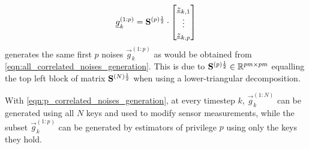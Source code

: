 \begin{equation}\label{eqn:p_correlated_noises_generation}
  {\underline{g}}_k^{(1:p)}=
  {{\mathbf{S}}}^{(p)\frac{1}{2}}\cdot
  \begin{bmatrix}
    {\underline{z}}_{k,1}\\
    \vdots\\
    {\underline{z}}_{k,p}
  \end{bmatrix}
\end{equation}
generates the same first $p$ noises $\vec{g}_k^{(1:p)}$ as would be obtained from \eqref{eqn:all_correlated_noises_generation}. This is due to ${{\mathbf{S}}}^{(p)\frac{1}{2}}\in\mathbb{R}^{pm\times pm}$ equalling the top left block of matrix ${{\mathbf{S}}}^{(N)\frac{1}{2}}$ when using a lower-triangular decomposition.

With \eqref{eqn:p_correlated_noises_generation}, at every timestep $k$, $\vec{g}_k^{(1:N)}$ can be generated using all $N$ keys and used to modify sensor measurements, while the subset $\vec{g}_k^{(1:p)}$ can be generated by estimators of privilege $p$ using only the keys they hold.

% 
% 

